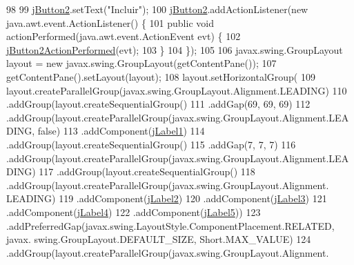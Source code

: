 \begin{DoxyCode}
98 
99         \mbox{\hyperlink{class_interfaz_package_1_1_alta_diccionario_a521eb08d96dea01d2c690fcbf9804e57}{jButton2}}.setText(\textcolor{stringliteral}{"Incluir"});
100         \mbox{\hyperlink{class_interfaz_package_1_1_alta_diccionario_a521eb08d96dea01d2c690fcbf9804e57}{jButton2}}.addActionListener(\textcolor{keyword}{new} java.awt.event.ActionListener() \{
101             \textcolor{keyword}{public} \textcolor{keywordtype}{void} actionPerformed(java.awt.event.ActionEvent evt) \{
102                 \mbox{\hyperlink{class_interfaz_package_1_1_alta_diccionario_aff2a0ab5bc48880d9115539f9dfbca78}{jButton2ActionPerformed}}(evt);
103             \}
104         \});
105 
106         javax.swing.GroupLayout layout = \textcolor{keyword}{new} javax.swing.GroupLayout(getContentPane());
107         getContentPane().setLayout(layout);
108         layout.setHorizontalGroup(
109             layout.createParallelGroup(javax.swing.GroupLayout.Alignment.LEADING)
110             .addGroup(layout.createSequentialGroup()
111                 .addGap(69, 69, 69)
112                 .addGroup(layout.createParallelGroup(javax.swing.GroupLayout.Alignment.LEADING, \textcolor{keyword}{false})
113                     .addComponent(\mbox{\hyperlink{class_interfaz_package_1_1_alta_diccionario_af8a39de35277501b7801eaf2c5ccbf33}{jLabel1}})
114                     .addGroup(layout.createSequentialGroup()
115                         .addGap(7, 7, 7)
116                         .addGroup(layout.createParallelGroup(javax.swing.GroupLayout.Alignment.LEADING)
117                             .addGroup(layout.createSequentialGroup()
118                                 .addGroup(layout.createParallelGroup(javax.swing.GroupLayout.Alignment.
      LEADING)
119                                     .addComponent(\mbox{\hyperlink{class_interfaz_package_1_1_alta_diccionario_ab2913168b8ce8c2e33af1a06a91424a1}{jLabel2}})
120                                     .addComponent(\mbox{\hyperlink{class_interfaz_package_1_1_alta_diccionario_a4acae592782e66c775de54bfe425ea0d}{jLabel3}})
121                                     .addComponent(\mbox{\hyperlink{class_interfaz_package_1_1_alta_diccionario_ace70621c67ef90297d4ff752d97c97c4}{jLabel4}})
122                                     .addComponent(\mbox{\hyperlink{class_interfaz_package_1_1_alta_diccionario_af33a0210b14d80015c323d59ca84e134}{jLabel5}}))
123                                 .addPreferredGap(javax.swing.LayoutStyle.ComponentPlacement.RELATED, javax.
      swing.GroupLayout.DEFAULT\_SIZE, Short.MAX\_VALUE)
124                                 .addGroup(layout.createParallelGroup(javax.swing.GroupLayout.Alignment.

\end{DoxyCode}
